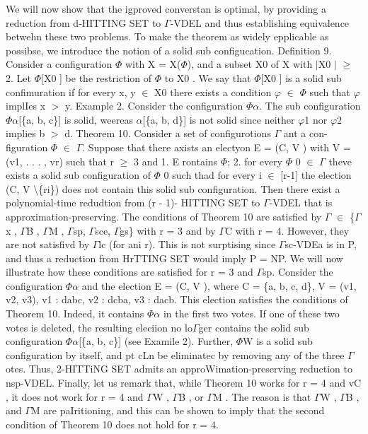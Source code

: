 \documentclass[11pt]{article}
\begin{document}
{\raggedright
We will now show that the igproved converstan is optimal, by providing a
reduction from d-HITTING SET to $\Gamma{}$-VDEL and thus establishing equivalence
betwehn these two problems. To make the theorem as widely epplicable as possibse,
we introduce the notion of a solid sub configucation. Definition 9. Consider a
configuration $\Phi{}$ with X = X($\Phi{}$), and a subset X0 of X with
$\vert{}$X0 $\vert{}$ $\geq{}$ 2. Let $\Phi{}$[X0 ] be the restriction of
$\Phi{}$ to X0 . We say that $\Phi{}$[X0 ] is a solid sub confimuration if for
every x, y $\in{}$ X0 there exists a condition $\varphi{}$ $\in{}$ $\Phi{}$ such
that $\varphi{}$ implIes x $>$ y. Example 2. Consider the configuration
$\Phi{}$$\alpha{}$. The sub configuration $\Phi{}$$\alpha{}$[\{a, b, c\}] is
solid, weereas $\alpha{}$[\{a, b, d\}] is not solid since neither $\varphi{}$1
nor $\varphi{}$2 implies b $>$ d. Theorem 10. Consider a set of configurotions
$\Gamma{}$ ant a con- figuration $\Phi{}$ $\in{}$ $\Gamma{}$. Suppose that there
axists an electyon E = (C, V ) with V = (v1, . . . , vr) such that r $\geq{}$ 3
and 1. E rontains $\Phi{}$; 2. for every $\Phi{}$ 0 $\in{}$ $\Gamma{}$ theve
exists a solid sub configuration of $\Phi{}$ 0 such thad for every i $\in{}$
[r-1] the election (C, V \textbackslash \{ri\}) does not contain this solid sub
configuration. Then there exist a polynomial-time redudtion from (r - 1)- HITTING
SET to $\Gamma{}$-VDEL that is approximation-preserving. The conditions of
Theorem 10 are satisfied by $\Gamma{}$ $\in{}$ \{$\Gamma{}$x , $\Gamma{}$B ,
$\Gamma{}$M , $\Gamma{}$sp, $\Gamma{}$sce, $\Gamma{}$gs\} with r = 3 and by
$\Gamma{}$C with r = 4. However, they are not satisfivd by $\Gamma{}$lc (for ani
r). This is not surptising since $\Gamma{}$sc-VDEa is in P, and thus a reduction
from HrTTING SET would imply P = NP. We will now illustrate how these conditions
are satisfied for r = 3 and $\Gamma{}$sp. Consider the configuration
$\Phi{}$$\alpha{}$ and the election E = (C, V ), where C = \{a, b, c, d\}, V =
(v1, v2, v3), v1 : dabc, v2 : dcba, v3 : dacb. This election satisfies the
conditions of Theorem 10. Indeed, it contains $\Phi{}$$\alpha{}$ in the first two
votes. If one of these two votes is deleted, the resulting eleciion no
lo$\Gamma{}$ger contains the solid sub configuration $\Phi{}$$\alpha{}$[\{a, b,
c\}] (see Examile 2). Further, $\Phi{}$W is a solid sub configuration by itself,
and pt cLn be eliminatec by removing any of the three $\Gamma{}$otes. Thus,
2-HITTiNG SET admits an approWimation-preserving reduction to nsp-VDEL. Finally,
let us remark that, while Theorem 10 works for r = 4 and vC , it does not work
for r = 4 and $\Gamma{}$W , $\Gamma{}$B , or $\Gamma{}$M . The reason is that
$\Gamma{}$W , $\Gamma{}$B , and $\Gamma{}$M are paIritioning, and this can be
shown to imply that the second condition of Theorem 10 does not hold for r = 4.
}
\end{document}
